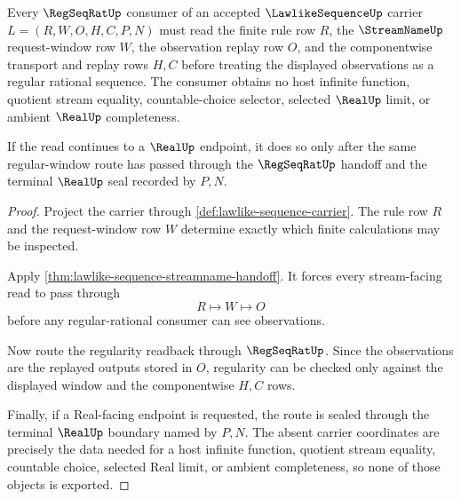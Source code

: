 \begin{theorem}
\label{thm:lawlike-sequence-regseqrat-regular-window-handoff}
Every $\RegSeqRatUp$ consumer of an accepted $\LawlikeSequenceUp$ carrier $L=(R,W,O,H,C,P,N)$ must read the finite rule row $R$, the $\StreamNameUp$ request-window row $W$, the observation replay row $O$, and the componentwise transport and replay rows $H,C$ before treating the displayed observations as a regular rational sequence. The consumer obtains no host infinite function, quotient stream equality, countable-choice selector, selected $\RealUp$ limit, or ambient $\RealUp$ completeness.

If the read continues to a $\RealUp$ endpoint, it does so only after the same regular-window route has passed through the $\RegSeqRatUp$ handoff and the terminal $\RealUp$ seal recorded by $P,N$.
\end{theorem}
\begin{proof}
Project the carrier through \autoref{def:lawlike-sequence-carrier}. The rule row $R$ and the request-window row $W$ determine exactly which finite calculations may be inspected.

Apply \autoref{thm:lawlike-sequence-streamname-handoff}. It forces every stream-facing read to pass through
$$
R\longmapsto W\longmapsto O
$$
before any regular-rational consumer can see observations.

Now route the regularity readback through $\RegSeqRatUp$. Since the observations are the replayed outputs stored in $O$, regularity can be checked only against the displayed window and the componentwise $H,C$ rows.

Finally, if a Real-facing endpoint is requested, the route is sealed through the terminal $\RealUp$ boundary named by $P,N$. The absent carrier coordinates are precisely the data needed for a host infinite function, quotient stream equality, countable choice, selected Real limit, or ambient completeness, so none of those objects is exported.
\end{proof}


